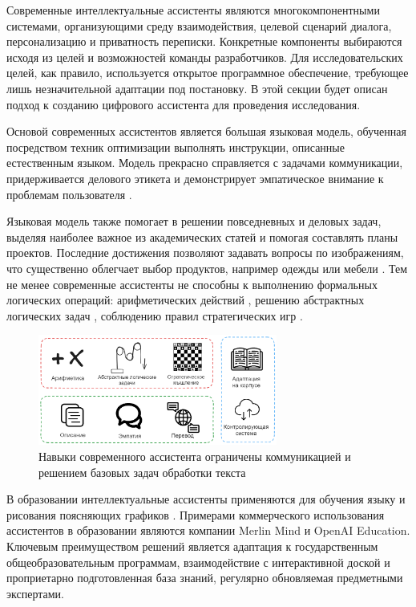 Современные интеллектуальные ассистенты являются многокомпонентными системами, организующими
среду взаимодействия, целевой сценарий диалога, персонализацию и приватность переписки. Конкретные компоненты
выбираются исходя из целей и возможностей команды разработчиков. Для исследовательских целей, как правило, используется
открытое программное обеспечение, требующее лишь незначительной адаптации под постановку. В этой секции 
будет описан подход к созданию цифрового ассистента для проведения исследования. 

Основой современных ассистентов является большая языковая модель, обученная посредством техник оптимизации выполнять
инструкции, описанные естественным языком. Модель прекрасно справляется с задачами коммуникации, придерживается делового
этикета и демонстрирует эмпатическое внимание к проблемам пользователя \cite{jiang2023mistral}\cite{llamatouvron2023}.

Языковая модель также помогает в решении повседневных и деловых задач, выделяя наиболее важное из академических статей и помогая составлять
планы проектов. Последние достижения позволяют задавать вопросы по изображениям, что существенно облегчает выбор продуктов, например одежды или мебели
\cite{bai2023qwen}. Тем не менее современные ассистенты не способны к выполнению формальных логических операций: 
арифметических действий \cite{bubeck2023sparks}, решению абстрактных логических задач \cite{bordt2023chatgpt}, соблюдению правил стратегических игр \cite{Adam2024}.

\begin{figure}[h]
    \centering
    \includegraphics[width=0.7\textwidth]{assets/work/arch/problems.excalidraw.png}
    \caption{Навыки современного ассистента ограничены коммуникацией и решением базовых задач обработки текста}
    \label{problems}
\end{figure}

В образовании интеллектуальные ассистенты применяются для обучения языку \cite{аль2019интеллектуальный} и рисования поясняющих графиков \cite{bulusuautomated}. 
Примерами коммерческого использования ассистентов в образовании являются компании Merlin Mind и OpenAI Education. Ключевым преимуществом решений 
является адаптация к государственным общеобразовательным программам, взаимодействие с интерактивной доской и проприетарно подготовленная база знаний, 
регулярно обновляемая предметными экспертами.
